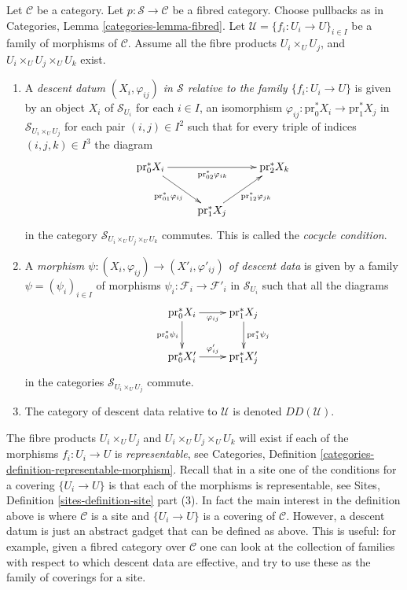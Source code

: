 \begin{definition}
\label{definition-descent-data}
Let $\mathcal{C}$ be a category.
Let $p : \mathcal{S} \to \mathcal{C}$ be a fibred category.
Choose pullbacks as in Categories, Lemma \ref{categories-lemma-fibred}.
Let $\mathcal{U} = \{f_i : U_i \to U\}_{i \in I}$
be a family of morphisms of $\mathcal{C}$. Assume all the fibre products
$U_i \times_U U_j$, and $U_i \times_U U_j \times_U U_k$ exist.
\begin{enumerate}
\item A {\it descent datum $(X_i, \varphi_{ij})$ in $\mathcal{S}$
relative to the family $\{f_i : U_i \to U\}$} is given by an object $X_i$
of $\mathcal{S}_{U_i}$ for each $i \in I$, an isomorphism
$\varphi_{ij} : \text{pr}_0^*X_i \to \text{pr}_1^*X_j$
in $\mathcal{S}_{U_i \times_U U_j}$ for each pair $(i, j) \in I^2$
such that for every triple of indices $(i, j, k) \in I^3$ the
diagram
$$
\xymatrix{
\text{pr}_0^*X_i \ar[rd]_{\text{pr}_{01}^*\varphi_{ij}}
\ar[rr]_{\text{pr}_{02}^*\varphi_{ik}} & &
\text{pr}_2^*X_k \\
& \text{pr}_1^*X_j \ar[ru]_{\text{pr}_{12}^*\varphi_{jk}} &
}
$$
in the category $\mathcal{S}_{U_i \times_U U_j \times_U U_k}$
commutes. This is called the {\it cocycle condition}.
\item A {\it morphism $\psi : (X_i, \varphi_{ij}) \to
(X'_i, \varphi'_{ij})$ of descent data} is given
by a family $\psi = (\psi_i)_{i\in I}$ of morphisms
$\psi_i : \mathcal{F}_i \to \mathcal{F}'_i$ in $\mathcal{S}_{U_i}$
such that all the diagrams
$$
\xymatrix{
\text{pr}_0^*X_i \ar[r]_{\varphi_{ij}} \ar[d]_{\text{pr}_0^*\psi_i}
& \text{pr}_1^*X_j \ar[d]^{\text{pr}_1^*\psi_j} \\
\text{pr}_0^*X'_i \ar[r]^{\varphi'_{ij}} &
\text{pr}_1^*X'_j \\
}
$$
in the categories $\mathcal{S}_{U_i \times_U U_j}$ commute.
\item The category of descent data relative to
$\mathcal{U}$ is denoted $DD(\mathcal{U})$.
\end{enumerate}
\end{definition}

\noindent
The fibre products $U_i \times_U U_j$ and $U_i \times_U U_j \times_U U_k$
will exist if each of the morphisms $f_i : U_i \to U$ is {\it representable},
see Categories, Definition \ref{categories-definition-representable-morphism}.
Recall that in a site one of the conditions for a covering $\{U_i \to U\}$ is
that each of the morphisms is representable, see
Sites, Definition \ref{sites-definition-site} part (3).
In fact the main interest in the definition above is where $\mathcal{C}$
is a site and $\{U_i \to U\}$ is a covering of $\mathcal{C}$. However,
a descent datum is just an abstract gadget that can be defined as above.
This is useful: for example, given a fibred category over $\mathcal{C}$
one can look at the collection of families with respect to which descent data
are effective, and try to use these as the family of coverings for a site.

